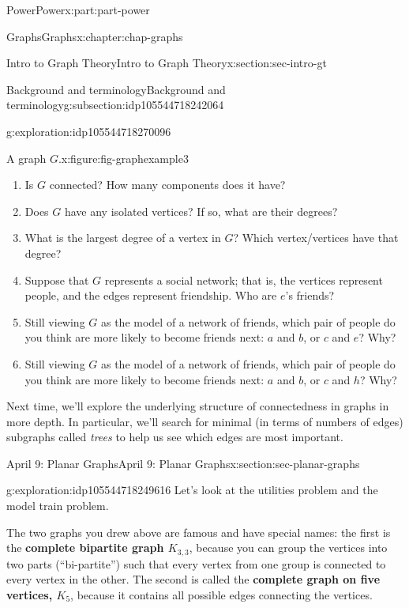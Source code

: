 \documentclass[oneside,10pt,]{book}
\newcommand{\terminology}[1]{\textbf{#1}}
\numberwithin{equation}{section}
\begin{document}
\begin{partptx}{Power}{}{Power}{}{}{x:part:part-power}
\begin{chapterptx}{Graphs}{}{Graphs}{}{}{x:chapter:chap-graphs}
\begin{sectionptx}{Intro to Graph Theory}{}{Intro to Graph Theory}{}{}{x:section:sec-intro-gt}
\begin{subsectionptx}{Background and terminology}{}{Background and terminology}{}{}{g:subsection:idp105544718242064}
\begin{exploration}{}{g:exploration:idp105544718270096}
\begin{figureptx}{A graph \(G\).}{x:figure:fig-graphexample3}{}
\begin{image}{0.25}{0.5}{0.25}
\end{image}%
\tcblower
\end{figureptx}%
%
\begin{enumerate}
\item{}Is \(G\) connected? How many components does it have?%
\item{}Does \(G\) have any isolated vertices? If so, what are their degrees?%
\item{}What is the largest degree of a vertex in \(G\)? Which vertex\slash{}vertices have that degree?%
\item{}Suppose that \(G\) represents a social network; that is, the vertices represent people, and the edges represent friendship. Who are \(e\)'s friends?%
\item{}Still viewing \(G\) as the model of a network of friends, which pair of people do you think are more likely to become friends next: \(a\) and \(b\), or \(c\) and \(e\)? Why?%
\item{}Still viewing \(G\) as the model of a network of friends, which pair of people do you think are more likely to become friends next: \(a\) and \(b\), or \(c\) and \(h\)? Why?%
\end{enumerate}
\end{exploration}%
Next time, we'll explore the underlying structure of connectedness in graphs in more depth. In particular, we'll search for minimal (in terms of numbers of edges) subgraphs called \emph{trees} to help us see which edges are most important.%
\end{subsectionptx}
\end{sectionptx}
%
%
\typeout{************************************************}
\typeout{************************************************}
%
\begin{sectionptx}{April 9: Planar Graphs}{}{April 9: Planar Graphs}{}{}{x:section:sec-planar-graphs}
\begin{exploration}{}{g:exploration:idp105544718249616}%
Let's look at the utilities problem and the model train problem.%
\end{exploration}%
The two graphs you drew above are famous and have special names: the first is the \terminology{complete bipartite graph \(K_{3,3}\)}, because you can group the vertices into two parts (``bi-partite'') such that every vertex from one group is connected to every vertex in the other. The second is called the \terminology{complete graph on five vertices, \(K_5\)}, because it contains all possible edges connecting the vertices.%

\end{sectionptx}
\end{chapterptx}
\end{partptx}
\end{document}
